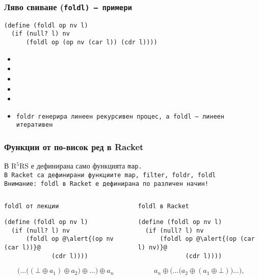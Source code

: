 \documentclass{beamer}
\begin{document}
\begin{frame}[fragile,label=foldlex]
  \frametitle{Ляво свиване (\tt{foldl}) --- примери}

\begin{lstlisting}
(define (foldl op nv l)
  (if (null? l) nv
      (foldl op (op nv (car l)) (cdr l))))
\end{lstlisting}
  \pause
  \small
  \begin{itemize}[<+->]
  \item {}
  \item {}
  \item {}
  \item {}
  \item {}
  \item \tt{foldr} генерира линеен рекурсивен процес, а \tt{foldl} --- линеен итеративен
  \end{itemize}
\end{frame}

\begin{frame}[fragile]
  \frametitle{Функции от по-висок ред в Racket}

  В R$^5$RS е дефинирана само функцията \tt{map}.\\
  В Racket са дефинирани функциите \tt{map}, \tt{filter}, \tt{foldr}, \tt{foldl}\\[1em]
  \pause
  \alert{Внимание: \tt{foldl} в Racket е дефинирана по различен начин!}\\[1em]
  \begin{columns}[T,onlytextwidth]
    \small
    \begin{column}{.5\textwidth}
      \tt{foldl} от лекции\\[1em]
\begin{lstlisting}
(define (foldl op nv l)
  (if (null? l) nv
      (foldl op @\alert{(op nv (car l))}@
             (cdr l))))
\end{lstlisting}
      \begin{equation*}
        \Big(\ldots\big((\bot \oplus a_1) \oplus a_2\big) \oplus \ldots\Big) \oplus a_n
      \end{equation*}
    \end{column}
    \begin{column}{.5\textwidth}
      \tt{foldl} в Racket\\[1em]
\begin{lstlisting}
(define (foldl op nv l)
  (if (null? l) nv
      (foldl op @\alert{(op (car l) nv)}@
             (cdr l))))
\end{lstlisting}
      \begin{equation*}
        a_n \oplus \Big(\ldots \big(a_2 \oplus (a_1 \oplus \bot)\big)\ldots\Big),
      \end{equation*}
    \end{column}
  \end{columns}
\end{frame}
\end{document}
